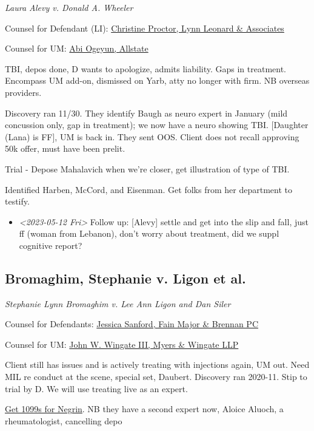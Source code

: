 \documentclass[11pt]{article}
\begin{document}
\emph{Laura Alevy v. Donald A. Wheeler}

Counsel for Defendant (LI): \href{https://gabar.reliaguide.com/lawyer/30091-GA-Christine-Proctor-272295}{Christine Proctor, Lynn Leonard \& Associates}

Counsel for UM: \href{https://gabar.reliaguide.com/lawyer/30043-GA-Abiemwense-Oyegun-278090}{Abi Ogeyun, Allstate}

TBI, depos done, D wants to apologize, admits liability. Gaps in treatment. Encompass UM add-on, dismissed on Yarb, atty no longer with firm. NB overseas providers.

Discovery ran 11/30. They identify Baugh as neuro expert in January (mild concussion only, gap in treatment); we now have a neuro showing TBI. [Daughter (Lana) is FF], UM is back in. They sent OOS. Client does not recall approving 50k offer, must have been prelit.

Trial - Depose Mahalavich when we're closer, get illustration of type of TBI. 

Identified Harben, McCord, and Eisenman. Get folks from her department to testify.

\begin{itemize}
\item \textit{<2023-05-12 Fri> } Follow up: [Alevy] settle and get into the slip and fall, just ff (woman from Lebanon), don't worry about treatment, did we suppl cognitive report?
\end{itemize}

\subsection*{Bromaghim, Stephanie v. Ligon et al.}
\label{sec:orgb83593d}

\emph{Stephanie Lynn Bromaghim v. Lee Ann Ligon and Dan Siler}

Counsel for Defendants: \href{https://www.gabar.org/MemberSearchDetail.cfm?ID=NjI2MTc2}{Jessica Sanford, Fain Major \& Brennan PC}

Counsel for UM: \href{https://www.gabar.org/MemberSearchDetail.cfm?ID=NzcwNjEw}{John W. Wingate III, Myers \& Wingate LLP}

Client still has issues and is actively treating with injections again, UM out. Need MIL re conduct at the scene, special set, Daubert. Discovery ran 2020-11. Stip to trial by D. We will use treating live as an expert.

\href{https://www.fastmail.com/mail/Action\_-\_Follow\_up/Mde43c64c6fa1836e114528ec?u=737c4181}{Get 1099s for Negrin}. NB they have a second expert now, Aloice Aluoch, a rheumatologist, cancelling depo
\end{document}
